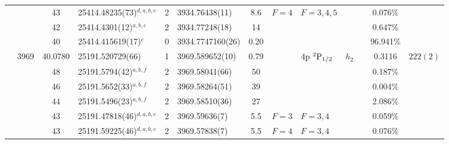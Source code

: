 \begin{table*}
\begin{center}
{\begin{tabular}{:l;l;c;l;c;l;c;l;l;c;c;c;c}
\rowstyle{\itshape}               &        & 43        & 25414.48235(73)$^{d,a,b,e}$      & 2 &    3934.76438(11)  &  8.6 & $F=4                                     $ & $F=3,4,5                                 $ & $      $ &              & 0.076\%   & $          $\\
\rowstyle{\itshape}               &        & 42        & 25414.4301(12)$^{a,b,c}$         & 2 &    3934.77248(18)  &   14 & $                                        $ & $                                        $ & $      $ &              & 0.647\%   & $          $\\
\rowstyle{\itshape}               &        & 40        & 25414.415619(17)$^{c}$           & 0 &  3934.7747160(26)  & 0.20 & $                                        $ & $                                        $ & $      $ &              & 96.941\%  & $          $\\
                                  & 3969   & 40.0780   & 25191.520729(66)$^{}$            & 1 &   3969.589652(10)  & 0.79 & $                                        $ & $4\rm{p}~^2\rm{P}_{1/2}                  $ & $h_{2} $ &              & 0.3116    & $  222(2)  $\\
\rowstyle{\itshape}               &        & 48        & 25191.5794(42)$^{a,b,f}$         & 2 &    3969.58041(66)  &   50 & $                                        $ & $                                        $ & $      $ &              & 0.187\%   & $          $\\
\rowstyle{\itshape}               &        & 46        & 25191.5652(33)$^{a,b,f}$         & 2 &    3969.58264(51)  &   39 & $                                        $ & $                                        $ & $      $ &              & 0.004\%   & $          $\\
\rowstyle{\itshape}               &        & 44        & 25191.5496(23)$^{a,b,f}$         & 2 &    3969.58510(36)  &   27 & $                                        $ & $                                        $ & $      $ &              & 2.086\%   & $          $\\
\rowstyle{\itshape}               &        & 43        & 25191.47818(46)$^{d,a,b,e}$      & 2 &    3969.59636(7)   &  5.5 & $F=3                                     $ & $F=3,4                                   $ & $      $ &              & 0.059\%   & $          $\\
\rowstyle{\itshape}               &        & 43        & 25191.59225(46)$^{d,a,b,e}$      & 2 &    3969.57838(7)   &  5.5 & $F=4                                     $ & $F=3,4                                   $ & $      $ &              & 0.076\%   & $          $\\

\end{tabular}}
\end{center}
\end{table*}
